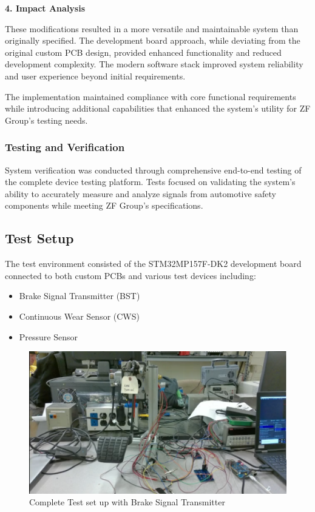 \documentclass[12pt]{article}
\begin{document}
\textbf{4. Impact Analysis}

These modifications resulted in a more versatile and maintainable system than
originally specified. The development board approach, while deviating from the
original custom PCB design, provided enhanced functionality and reduced
development complexity. The modern software stack improved system reliability
and user experience beyond initial requirements.

The implementation maintained compliance with core functional requirements
while introducing additional capabilities that enhanced the system's utility
for ZF Group's testing needs.

\subsubsection{Testing and Verification}

System verification was conducted through comprehensive end-to-end testing of
the complete device testing platform. Tests focused on validating the system's
ability to accurately measure and analyze signals from automotive safety
components while meeting ZF Group's specifications.

\subsection{Test Setup}

The test environment consisted of the STM32MP157F-DK2 development board
connected to both custom PCBs and various test devices including:
\begin{itemize} 
  \item Brake Signal Transmitter (BST) 
  \item Continuous Wear Sensor (CWS) 
  \item Pressure Sensor 
\end{itemize}

\begin{figure}[H]
  \includegraphics[width=\textwidth]{../assets/test-setup.png}
  \caption{Complete Test set up with Brake Signal Transmitter}
\end{figure}
\end{document}

